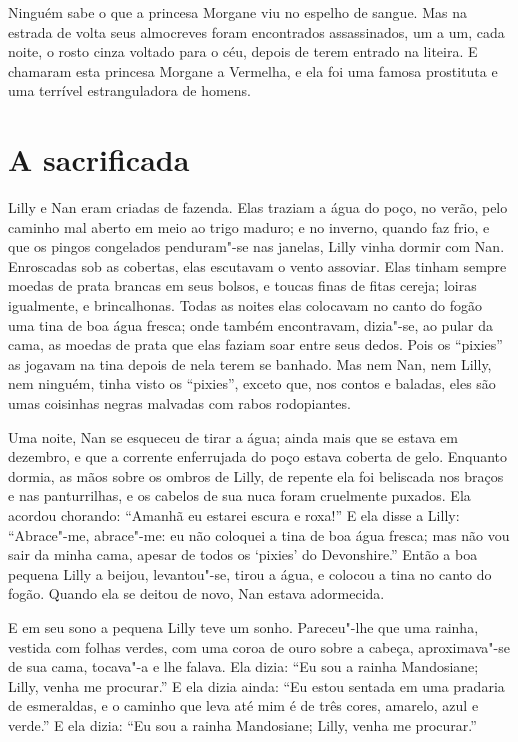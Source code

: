 Ninguém sabe o que a princesa Morgane viu no espelho de sangue. Mas na
estrada de volta seus almocreves foram encontrados assassinados, um a um,
cada noite, o rosto cinza voltado para o céu, depois de terem entrado na
liteira. E chamaram esta princesa Morgane a Vermelha, e ela foi uma famosa
prostituta e uma terrível estranguladora de homens.

\section*{A sacrificada}

Lilly e Nan eram criadas de fazenda. Elas traziam a água do poço, no
verão, pelo caminho mal aberto em meio ao trigo maduro; e no inverno, quando faz
frio, e que os pingos congelados penduram"-se nas janelas, Lilly vinha
dormir com Nan. Enroscadas sob as cobertas, elas escutavam o vento
assoviar. Elas tinham sempre moedas de prata brancas em seus bolsos, e toucas finas
de fitas cereja; loiras igualmente, e brincalhonas. Todas as noites elas
colocavam no canto do fogão uma tina de boa água fresca; onde também
encontravam, dizia"-se, ao pular da cama, as moedas de prata que elas faziam soar
entre seus dedos. Pois os “pixies” as jogavam na tina depois de nela terem se
banhado. Mas nem Nan, nem Lilly, nem ninguém, tinha visto os “pixies”, exceto que,
nos contos e baladas, eles são umas coisinhas negras malvadas com rabos
rodopiantes.

Uma noite, Nan se esqueceu de tirar a água; ainda mais que se estava em
dezembro, e que a corrente enferrujada do poço estava coberta de gelo.
Enquanto dormia, as mãos sobre os ombros de Lilly, de repente ela foi
beliscada nos braços e nas panturrilhas, e os cabelos de sua nuca foram
cruelmente puxados. Ela acordou chorando: ``Amanhã eu estarei escura e
roxa!'' E ela disse a Lilly: “Abrace"-me, abrace"-me: eu não coloquei a tina
de boa água fresca; mas não vou sair da minha cama, apesar de todos os
`pixies' do Devonshire.” Então a boa pequena Lilly a beijou, levantou"-se,
tirou a água, e colocou a tina no canto do fogão. Quando ela se deitou de
novo, Nan estava adormecida.


E em seu sono a pequena Lilly teve um sonho. Pareceu"-lhe que uma
rainha, vestida com folhas verdes, com uma coroa de ouro sobre a cabeça,
aproximava"-se de sua cama, tocava"-a e lhe falava. Ela dizia: “Eu sou a
rainha Mandosiane; Lilly, venha me procurar.” E ela dizia ainda: “Eu estou
sentada em uma pradaria de esmeraldas, e o caminho que leva até mim é de
três cores, amarelo, azul e verde.” E ela dizia: “Eu sou a rainha
Mandosiane; Lilly, venha me procurar.”

